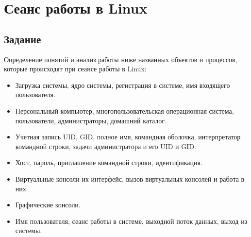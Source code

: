 \chapter{Сеанс работы в Linux}

\section{Задание}
	Определение понятий и анализ работы ниже названных объектов и процессов, которые происходят при сеансе работы в Linux:
\begin{itemize}
	\item Загрузка системы, ядро ​​системы, регистрация в системе, имя входящего пользователя.
	\item Персональный компьютер, многопользовательская операционная система, 					пользователи, администраторы, домашний каталог.
	\item Учетная запись UID, GID, полное имя, командная оболочка, интерпретатор командной 	строки, задачи администратора и его UID и GID.
	\item Хост, пароль, приглашение командной строки, идентификация.
	\item Виртуальные консоли их интерфейс, вызов виртуальных консолей и работа в них.
	\item Графические консоли.
	\item Имя пользователя, сеанс работы в системе, выходной поток данных, выход из 			системы.
\end{itemize}

